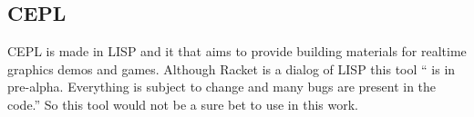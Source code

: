 

\subsection{CEPL} %
\label{ssec:cepl}

CEPL is made in LISP and it that aims to provide building materials for realtime graphics demos and games. Although Racket is a dialog of LISP this tool `` is in pre-alpha. Everything is subject to change and many bugs are present in the code.''\cite{CEPL_GIT} So this tool would not be a sure bet to use in this work.







